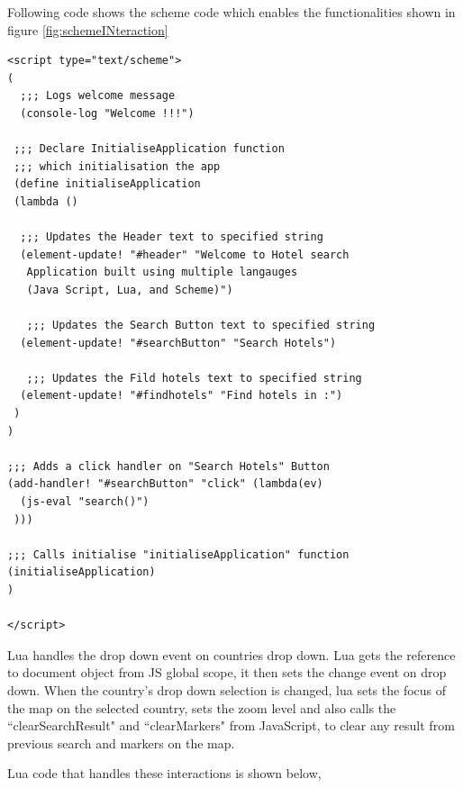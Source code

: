 Following code shows the scheme code which enables the functionalities shown in figure \ref{fig:schemeINteraction}

 \begin{lstlisting}[frame=single, style=base]
<script type="text/scheme">
(
  ;;; Logs welcome message
  (console-log "Welcome !!!")
 
 ;;; Declare InitialiseApplication function 
 ;;; which initialisation the app
 (define initialiseApplication
 (lambda ()
  
  ;;; Updates the Header text to specified string
  (element-update! "#header" "Welcome to Hotel search 
   Application built using multiple langauges
   (Java Script, Lua, and Scheme)")
  
   ;;; Updates the Search Button text to specified string
  (element-update! "#searchButton" "Search Hotels")
  
   ;;; Updates the Fild hotels text to specified string
  (element-update! "#findhotels" "Find hotels in :")
 )
)

;;; Adds a click handler on "Search Hotels" Button
(add-handler! "#searchButton" "click" (lambda(ev)
  (js-eval "search()")
 )))
 
;;; Calls initialise "initialiseApplication" function
(initialiseApplication)
)

</script>
 \end{lstlisting}
 
Lua handles the drop down event on countries drop down. Lua gets the reference to document object from JS global scope, it then sets the change event on drop down. When the country's drop down selection is changed, lua sets the focus of the map on the selected country, sets the zoom level and also calls the ``clearSearchResult" and ``clearMarkers" from JavaScript, to clear any result from previous search and markers on the map. 

Lua code that handles these interactions is shown below, 
 
